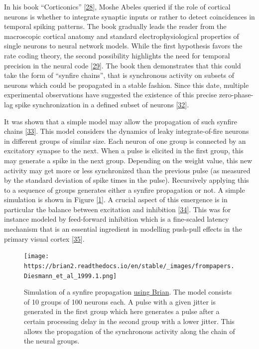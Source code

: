 In his book ``Corticonics'' {[}\protect\hyperlink{ref-19MS6Bbwp}{28}{]}, Moshe Abeles queried if the role of cortical neurons is whether to integrate synaptic inputs or rather to detect coincidences in temporal spiking patterns. The book gradually leads the reader from the macroscopic cortical anatomy and standard electrophysiological properties of single neurons to neural network models. While the first hypothesis favors the rate coding theory, the second possibility highlights the need for temporal precision in the neural code {[}\protect\hyperlink{ref-lT1Ato7P}{29}{]}. The book then demonstrates that this could take the form of ``synfire chains'', that is synchronous activity on subsets of neurons which could be propagated in a stable fashion. Since this date, multiple experimental observations have suggested the existence of this precise zero-phase-lag spike synchronization in a defined subset of neurons {[}\protect\hyperlink{ref-R2E2wRFg}{32}{]}.

It was shown that a simple model may allow the propagation of such synfire chains {[}\protect\hyperlink{ref-xbqYi2PD}{33}{]}. This model considers the dynamics of leaky integrate-of-fire neurons in different groups of similar size. Each neuron of one group is connected by an excitatory synapse to the next. When a pulse is elicited in the first group, this may generate a spike in the next group. Depending on the weight value, this new activity may get more or less synchronized than the previous pulse (as measured by the standard deviation of spike times in the pulse). Recursively applying this to a sequence of groups generates either a synfire propagation or not. A simple simulation is shown in Figure {[}\ref{fig:diesman}{]}. A crucial aspect of this emergence is in particular the balance between excitation and inhibition {[}\protect\hyperlink{ref-DL2NpHxr}{34}{]}. This was for instance modeled by feed-forward inhibition which is a fine-scaled latency mechanism that is an essential ingredient in modelling push-pull effects in the primary visual cortex {[}\protect\hyperlink{ref-mszJ8wdv}{35}{]}.

\begin{figure}
\hypertarget{fig:diesman}{%
\centering
\texttt{[image: https://brian2.readthedocs.io/en/stable/\_images/frompapers.Diesmann\_et\_al\_1999.1.png]}
\caption{Simulation of a synfire propagation \href{https://brian2.readthedocs.io/en/stable/examples/frompapers.Diesmann_et_al_1999.html}{using Brian}. The model consists of 10 groups of 100 neurons each. A pulse with a given jitter is generated in the first group which here generates a pulse after a certain processing delay in the second group with a lower jitter. This allows the propagation of the synchronous activity along the chain of the neural groups.}\label{fig:diesman}
}
\end{figure}

